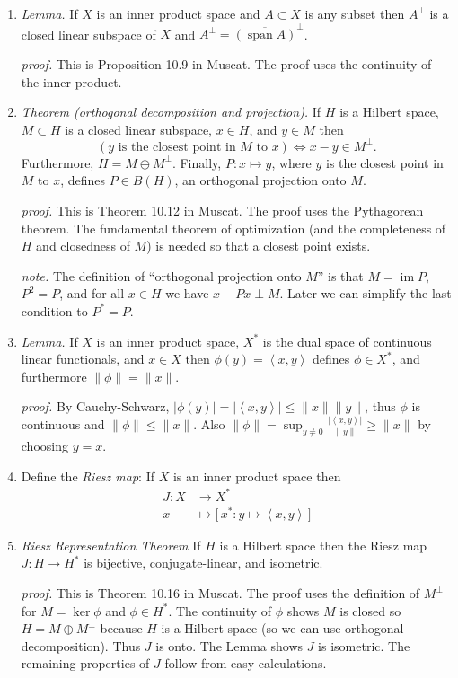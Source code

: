 \documentclass[11pt]{article}
\newcommand{\ip}[2]{\ensuremath{\left<#1,#2\right>}}
\newcommand{\image}{\operatorname{im}}
\begin{document}
\begin{enumerate}
\item \emph{Lemma.} If $X$ is an inner product space and $A\subset X$ is any subset then $A^\perp$ is a closed linear subspace of $X$ and $A^\perp = \overline{(\operatorname{span} A)}^\perp$.

\emph{proof.} This is Proposition 10.9 in Muscat.  The proof uses the continuity of the inner product.

\item \emph{Theorem (orthogonal decomposition and projection).}  If $H$ is a Hilbert space, $M\subset H$ is a closed linear subspace, $x\in H$, and $y\in M$ then
    $$\left(y \text{ is the closest point in $M$ to } x\right) \iff x-y \in M^\perp.$$
Furthermore, $H=M\oplus M^\perp$.  Finally, $P:x\mapsto y$, where $y$ is the closest point in $M$ to $x$, defines $P\in B(H)$, an orthogonal projection onto $M$.

\emph{proof.}  This is Theorem 10.12 in Muscat.  The proof uses the Pythagorean theorem.  The fundamental theorem of optimization (and the completeness of $H$ and closedness of $M$) is needed so that a closest point exists.

\emph{note.}  The definition of ``orthogonal projection onto $M$'' is that $M=\image P$, $P^2=P$, and for all $x\in H$ we have $x-Px \perp M$.  Later we can simplify the last condition to $P^*=P$.

\item \emph{Lemma.}  If $X$ is an inner product space, $X^*$ is the dual space of continuous linear functionals, and $x\in X$ then $\phi(y) = \ip{x}{y}$ defines $\phi\in X^*$, and furthermore $\|\phi\| = \|x\|$.

\emph{proof.} By Cauchy-Schwarz, $|\phi(y)| = |\ip{x}{y}| \le \|x\|\|y\|$, thus $\phi$ is continuous and $\|\phi\|\le \|x\|$.  Also $\|\phi\|=\sup_{y\ne 0} \frac{|\ip{x}{y}|}{\|y\|} \ge \|x\|$ by choosing $y=x$.

\item Define the \emph{Riesz map}:  If $X$ is an inner product space then
\begin{align*}
J:X &\to X^* \\
  x &\mapsto \big[\,x^*: y\mapsto \ip{x}{y}\,\big]
\end{align*}

\item \emph{Riesz Representation Theorem}  If $H$ is a Hilbert space then the Riesz map $J:H \to H^*$ is bijective, conjugate-linear, and isometric.

\emph{proof.}  This is Theorem 10.16 in Muscat.  The proof uses the definition of $M^\perp$ for $M=\ker \phi$ and $\phi \in H^*$.  The continuity of $\phi$ shows $M$ is closed so $H=M\oplus M^\perp$ because $H$ is a Hilbert space (so we can use orthogonal decomposition).  Thus $J$ is onto.  The Lemma shows $J$ is isometric.  The remaining properties of $J$ follow from easy calculations.


\end{enumerate}
\end{document}
